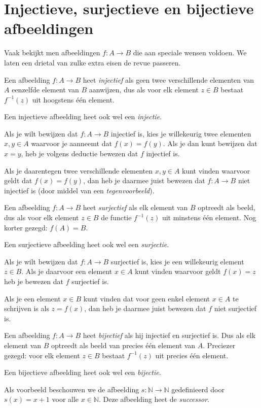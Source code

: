 \section{Injectieve, surjectieve en bijectieve afbeeldingen}
Vaak bekijkt men afbeeldingen $f:A\rightarrow B$ die aan speciale wensen voldoen. We laten een drietal van zulke extra eisen de revue passeren.

Een afbeelding $f:A\rightarrow B$ heet \textit{injectief} als geen twee verschillende elementen van $A$ eenzelfde element van $B$ aanwijzen, dus als voor elk element $z\in B$ bestaat $f^{-1}(z)$ uit hoogstens \'e\'en element.

Een injectieve afbeelding heet ook wel een \textit{injectie}.

Als je wilt bewijzen dat $f:A\rightarrow B$ injectief is, kies je willekeurig twee elementen $x,y \in A$ waarvoor je aanneemt dat $f(x)=f(y)$. Als je dan kunt bewijzen dat $x=y$, heb je volgens deductie bewezen dat $f$ injectief is.

Als je daarentegen twee verschillende elementen $x,y\in A$ kunt vinden waarvoor geldt dat $f(x)=f(y)$, dan heb je daarmee juist bewezen dat $f:A\rightarrow B$ niet injectief is (door middel van een \textit{tegenvoorbeeld}).

Een afbeelding $f:A\rightarrow B$ heet \textit{surjectief} als elk element van $B$ optreedt als beeld, dus als voor elk element $z\in B$ de functie $f^{-1}(z)$ uit minstens \'e\'en element. Nog korter gezegd: $f(A)=B$.

Een surjectieve afbeelding heet ook wel een \textit{surjectie}.

Als je wilt bewijzen dat $f:A\rightarrow B$ surjectief is, kies je een willekeurig element $z\in B$. Als je daarvoor een element $x\in A$ kunt vinden waarvoor geldt $f(x)=z$ heb je bewezen dat $f$ surjectief is.

Als je een element $x\in B$ kunt vinden dat voor geen enkel element $x\in A$ te schrijven is als $z=f(x)$, dan heb je daarmee juist bewezen dat $f$ niet surjectief is.

Een afbeelding $f:A\rightarrow B$ heet \textit{bijectief} als hij injectief en surjectief is. Dus als elk element van $B$ optreedt als beeld van precies \'e\'en element van $A$. Preciezer gezegd: voor elk element $z\in B$ bestaat $f^{-1}(z)$ uit precies \'e\'en element.

Een bijectieve afbeelding heet ook wel een \textit{bijectie}.

Als voorbeeld beschouwen we de afbeelding $s:\mathbb{N}\rightarrow\mathbb{N}$ gedefinieerd door $s(x)=x+1$ voor alle $x\in\mathbb{N}$. Deze afbeelding heet de \textit{successor}.

